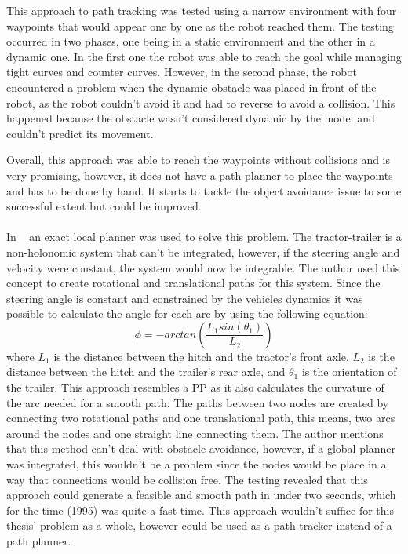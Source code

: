 This approach to path tracking was tested using a narrow environment with four waypoints that would 
appear one by one as the robot reached them. The testing occurred in two phases, one being in a static 
environment and the other in a dynamic one. In the first one the robot was able to reach the 
goal while managing tight curves and counter curves. However, in the second phase, the robot 
encountered a problem when the dynamic obstacle was placed in front of the robot, as the robot couldn't 
avoid it and had to reverse to avoid a collision. This happened because the obstacle wasn't considered 
dynamic by the model and couldn't predict its movement.

Overall, this approach was able to reach the waypoints without collisions and is very promising, however, 
it does not have a path planner to place the waypoints and has to be done by hand. It starts to 
tackle the object avoidance issue to some successful extent but could be improved.

\paragraph{} In ~\cite{ttex3} an exact local planner was used to solve this problem. The tractor-trailer is a 
non-holonomic system that can't be integrated, however, if the steering angle and velocity were constant, 
the system would now be integrable. The author used this concept to create rotational and translational 
paths for this system. Since the steering angle is constant and constrained by the vehicles dynamics 
it was possible to calculate the angle for each arc by using the following equation:
\begin{equation}
    \phi = -arctan(\frac{L_1sin(\theta_1)}{L_2})
\end{equation}
where $L_1$ is the distance between the hitch and the tractor's front axle, $L_2$ is the distance between the 
hitch and the trailer's rear axle, and $\theta_1$ is the orientation of the trailer. This approach 
resembles a \gls{PP} as it also calculates the curvature of the arc needed for a smooth 
path. The paths between two nodes are created by connecting two rotational paths and one translational path, this means, two arcs around 
the nodes and one straight line connecting them. The author mentions that this method can't deal 
with obstacle avoidance, however, if a global planner was integrated, this wouldn't be 
a problem since the nodes would be place in a way that connections would be collision free. 
The testing revealed that this approach could generate a feasible and smooth path in under two seconds, 
which for the time (1995) was quite a fast time. This approach wouldn't suffice for this thesis' 
problem as a whole, however could be used as a path tracker instead of a path planner.

